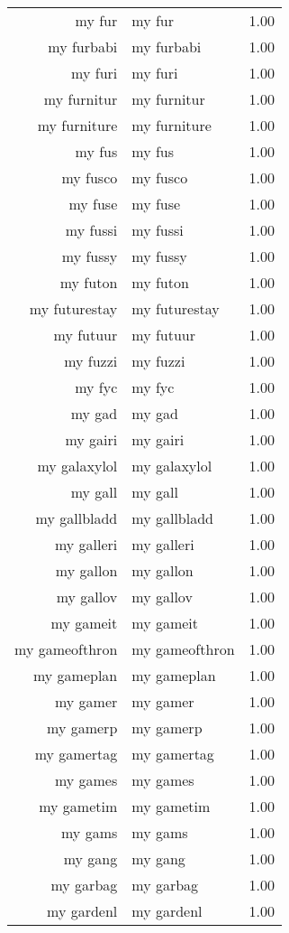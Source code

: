 \begin{table}[ht]
\begin{tabular}{rlr}
  my fur & my fur & 1.00 \\ 
  my furbabi & my furbabi & 1.00 \\ 
  my furi & my furi & 1.00 \\ 
  my furnitur & my furnitur & 1.00 \\ 
  my furniture & my furniture & 1.00 \\ 
  my fus & my fus & 1.00 \\ 
  my fusco & my fusco & 1.00 \\ 
  my fuse & my fuse & 1.00 \\ 
  my fussi & my fussi & 1.00 \\ 
  my fussy & my fussy & 1.00 \\ 
  my futon & my futon & 1.00 \\ 
  my futurestay & my futurestay & 1.00 \\ 
  my futuur & my futuur & 1.00 \\ 
  my fuzzi & my fuzzi & 1.00 \\ 
  my fyc & my fyc & 1.00 \\ 
  my gad & my gad & 1.00 \\ 
  my gairi & my gairi & 1.00 \\ 
  my galaxylol & my galaxylol & 1.00 \\ 
  my gall & my gall & 1.00 \\ 
  my gallbladd & my gallbladd & 1.00 \\ 
  my galleri & my galleri & 1.00 \\ 
  my gallon & my gallon & 1.00 \\ 
  my gallov & my gallov & 1.00 \\ 
  my gameit & my gameit & 1.00 \\ 
  my gameofthron & my gameofthron & 1.00 \\ 
  my gameplan & my gameplan & 1.00 \\ 
  my gamer & my gamer & 1.00 \\ 
  my gamerp & my gamerp & 1.00 \\ 
  my gamertag & my gamertag & 1.00 \\ 
  my games & my games & 1.00 \\ 
  my gametim & my gametim & 1.00 \\ 
  my gams & my gams & 1.00 \\ 
  my gang & my gang & 1.00 \\ 
  my garbag & my garbag & 1.00 \\ 
  my gardenl & my gardenl & 1.00 \\ 

\end{tabular}
\end{table}
